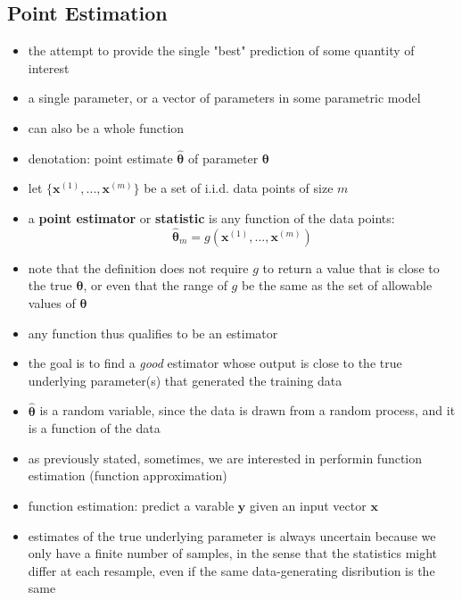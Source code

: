 \documentclass[11pt, twocolumn]{report}
\def\statistic{\hat{\bm{\theta}}}
\def\parameter{\bm{\theta}}
\begin{document}
\subsection{Point Estimation}
\begin{itemize}
  \item the attempt to provide the single "best" prediction of some quantity of
    interest
  \item a single parameter, or a vector of parameters in some parametric model
  \item can also be a whole function
  \item denotation: point estimate $\statistic$ of parameter
    $\parameter$
  \item let $\{\bm{x}^{(1)},...,\bm{x}^{(m)}\}$ be a set of i.i.d. data points
    of size $m$
  \item a \textbf{point estimator} or \textbf{statistic} is any function of the
    data points:
    \begin{equation}
      \statistic_m = g(\bm{x}^{(1)},...,\bm{x}^{(m)})
    \end{equation}
  \item note that the definition does not require $g$ to return a value that is
    close to the true $\parameter$, or even that the range of $g$ be the same
    as the set of allowable values of $\parameter$
  \item any function thus qualifies to be an estimator
  \item the goal is to find a \textit{good} estimator whose output is close to
    the true underlying parameter(s) that generated the training data
  \item $\statistic$ is a random variable, since the data is drawn from
    a random process, and it is a function of the data
  \item as previously stated, sometimes, we are interested in performin
    function estimation (function approximation)
  \item function estimation: predict a varable $\bm{y}$ given an input vector
    $\bm{x}$
  \item estimates of the true underlying parameter is always uncertain because
    we only have a finite number of samples, in the sense that the statistics
    might differ at each resample, even if the same data-generating disribution
    is the same
\end{itemize}
\end{document}
